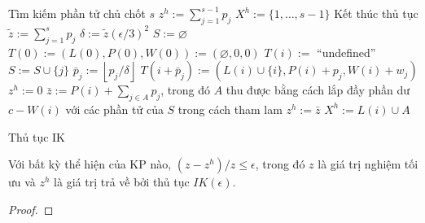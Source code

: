 \begin{algorithm}[!ht]
    \DontPrintSemicolon
    \vspace{1em}
    \vspace{1em}
    Tìm kiếm phần tử chủ chốt $s$\;
    {
        $z^h := \sum_{j=1}^{s-1}p_j$\;
        $X^h:= \{1, \dots, s - 1\}$\;
        Kết thúc thủ tục\;
    }
    $\widetilde{z} := \sum_{j=1}^sp_j$\;
    $\delta := \widetilde{z}(\epsilon / 3)^2$\;
    $S := \varnothing$\;
    $T(0) := (L(0), P(0), W(0)) := (\varnothing, 0, 0)$\;
    {
        $T(i) := $ ``undefined''\;
    }
    {
        {
            $S := S \cup \{j\}$\;
        }
        \Else
        {
            $\bar{p}_j := \left \lfloor p_j /\delta\right \rfloor$\;
            {
                {
                    {
                        $T(i+\bar{p}_j) := (L(i) \cup \{i\}, P(i) + p_j, W(i) + w_j)$\;
                    }
                }
            }
        }
    }
    $z^h := 0$\;
    {
        {
            $\bar{z} := P(i) + \sum_{j \in A}p_j$, trong đó $A$ thu được bằng cách lắp đầy phần dư $c - W(i)$ với các phần tử của $S$ trong cách tham lam\;
            {
                $z^h := \bar{z}$\;
                $X^h := L(i) \cup A$\;
            }
        }
    }
    \caption{Thủ tục IK}
    \label{algo:ik}
\end{algorithm}

\begin{theorem}
    Với bất kỳ thể hiện của KP nào, $(z - z^h) / z \leq \epsilon$, trong đó $z$ là giá trị nghiệm tối ưu và $z^h$ là giá trị trả về bởi thủ tục $IK(\epsilon)$.
\end{theorem}
\begin{proof}
    
\end{proof}

\begin{example}
    
\end{example}

